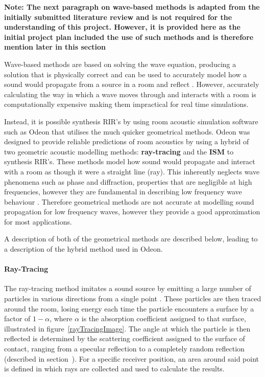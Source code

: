 \documentclass[../../main.tex]{subfiles}
\begin{document}
			\textbf{Note: The next paragraph on wave-based methods is adapted from the initially submitted literature review and is not required for the understanding of this project. However, it is provided here as the initial project plan included the use of such methods and is therefore mention later in this section}

			Wave-based methods are based on solving the wave equation, producing a solution that is physically correct and can be used to accurately model how a sound would propagate from a source in a room and reflect \cite{Siltanen2010}. However, accurately calculating the way in which a wave moves through and interacts with a room is computationally expensive making them impractical for real time simulations.

			Instead, it is possible synthesis \ac{RIR}'s by using room acoustic simulation software such as Odeon \cite{odeon} that utilises the much quicker geometrical methods. Odeon was designed to provide reliable predictions of room acoustics by using a hybrid of two geometric acoustic modelling methods: \textbf{ray-tracing} and the \textbf{\ac{ISM}} to synthesis \ac{RIR}'s. These methods model how sound would propagate and interact with a room as though it were a straight line (ray). This inherently neglects wave phenomena such as phase and diffraction, properties that are negligible at high frequencies, however they are fundamental in describing low frequency wave behaviour \cite{Siltanen2010}. Therefore geometrical methods are not accurate at modelling sound propagation for low frequency waves, however they provide a good approximation for most applications.

			A description of both of the geometrical methods are described below, leading to a description of the hybrid method used in Odeon.

		\paragraph{Ray-Tracing}
		\label{rayTracing}
			The ray-tracing method imitates a sound source by emitting a large number of particles in various directions from a single point \cite{Rindel1995}. These particles are then traced around the room,  losing energy each time the particle encounters a surface by a factor of $1 - \alpha$, where $\alpha$ is the absorption coefficient assigned to that surface, illustrated in figure~\ref{rayTracingImage}. The angle at which the particle is then reflected is determined by the scattering coefficient assigned to the surface of contact, ranging from a specular reflection to a completely random reflection \cite{odeonManual} (described in section~). For a specific receiver position, an area around said point is defined in which rays are collected and used to calculate the results.
\end{document}
